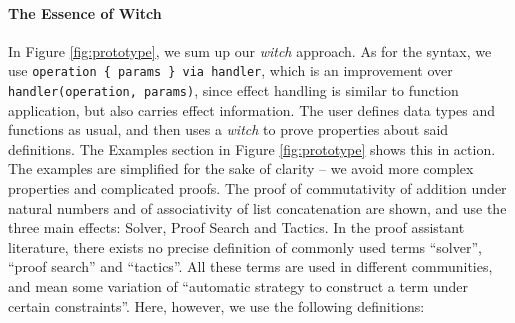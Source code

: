 \documentclass[sigconfl]{acmart}
\begin{document}
\paragraph{The Essence of Witch}
In Figure \ref{fig:prototype}, we sum up our \textit{witch} approach.
As for the syntax, we use \texttt{operation \{ params \} via handler}, which is an
improvement over \texttt{handler(operation, params)}, since effect handling is similar
to function application, but also carries effect information.
The user defines data types and functions as usual, and then uses a
\textit{witch} to prove properties about said definitions. The Examples
section in Figure \ref{fig:prototype} shows this in action. The examples are
simplified for the sake of clarity -- we avoid
more complex properties and complicated proofs. The proof of
commutativity of addition under natural numbers and of associativity of list
concatenation are shown, and use the three main effects: Solver, Proof Search
and Tactics. In the proof assistant literature, there exists no precise
definition of commonly used terms ``solver'', ``proof search'' and ``tactics''.
All these terms are used in different communities, and mean some variation of
``automatic strategy to construct a term under certain constraints''. Here,
however, we use the following definitions:
\end{document}
